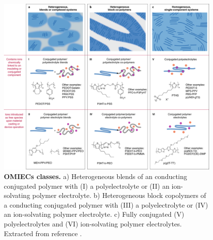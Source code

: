 \begin{figure}[h]
  \centering
  \includegraphics[width=\textwidth]{Images/pdf/OMIEC_types.pdf}
  \caption[Material classes of OMIECs]{\textbf{OMIECs classes.} a) Heterogeneous blends of an conducting conjugated polymer with (I) %
  a polyelectrolyte or (II) an ion-solvating polymer electrolyte. %
  b) Heterogeneous block copolymers of a conducting conjugated polymer with (III) %
  a polyelectrolyte or (IV) an ion-solvating polymer electrolyte. %
  c) Fully conjugated (V) %
  polyelectrolytes and (VI) ion-solvating polymer electrolytes. %
  Extracted from reference \cite{paulsenOrganicMixedIonic2020}.}
  \label{fig:omiectypes}
\end{figure}



